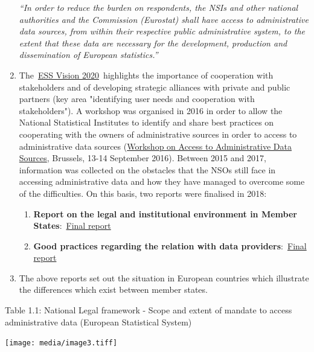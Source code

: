 \documentclass[
]{article}
\begin{document}
\begin{enumerate}
  \emph{``In order to reduce the burden on respondents, the NSIs and other
  national authorities and the Commission (Eurostat) shall have access
  to administrative data sources, from within their respective public
  administrative system, to the extent that these data are necessary
  for the development, production and dissemination of European
  statistics.'' }
\item
  The~\href{http://ec.europa.eu/eurostat/web/ess/about-us/ess-vision-2020}{ESS Vision
  2020}~highlights
  the importance of cooperation with stakeholders and of developing
  strategic alliances with private and public partners (key area
  "identifying user needs and cooperation with stakeholders"). A
  workshop was organised in 2016 in order to allow the National
  Statistical Institutes to identify and share best practices on
  cooperating with the owners of administrative sources in order to
  access to administrative data sources (\href{https://ec.europa.eu/eurostat/cros/content/2016-workshop-access-administrative-sources_en}{Workshop on Access to
  Administrative Data
  Sources},
  Brussels, 13-14 September 2016). Between 2015 and 2017, information
  was collected on the obstacles that the NSOs still face in accessing
  administrative data and how they have managed to overcome some of
  the difficulties. On this basis, two reports were finalised in 2018:

  \begin{enumerate}
  \def\labelenumii{\arabic{enumii}.}
  \setcounter{enumii}{3}
  \item
    \textbf{Report on the legal and institutional environment in Member
    States}:~\href{https://ec.europa.eu/eurostat/cros/system/files/admin-wp1.1_analysis_legal_institutional_environment_final.pdf}{Final
    report}
  \item
    \textbf{Good practices regarding the relation with data
    providers}:~\href{https://ec.europa.eu/eurostat/cros/system/files/admin-wp1.2_good_practices_final.pdf}{Final
    report}
  \end{enumerate}
\item
  The above reports set out the situation in European countries which
  illustrate the differences which exist between member states.
\end{enumerate}

Table 1.1: National Legal framework - Scope and extent of mandate to
access administrative data (European Statistical System)

\texttt{[image: media/image3.tiff]}
\end{document}
